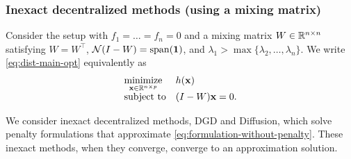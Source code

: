 \documentclass[10pt,mathserif]{beamer}
\begin{document}






\begin{frame}
\frametitle{Inexact decentralized methods (using a mixing matrix)}
Consider the setup with $f_1=\dots=f_n=0$ and a mixing matrix $W\in \mathbb{R}^{n\times n}$ satisfying $W=W^\intercal$, $\mathcal{N}(I-W)=\mathrm{span}({\mathbf{1}})$, and $\lambda_1>\max{\{\lambda_2,\dots,\lambda_n\}}$.
We write \eqref{eq:dist-main-opt} equivalently as
\begin{equation}
\begin{array}{ll}
\underset{{\mathbf{x}}\in\mathbb{R}^{n\times p}}{\mbox{minimize}} &h({\mathbf{x}})\\
\mbox{subject to}&(I-W){\mathbf{x}}=0.
\end{array}
\label{eq:formulation-without-penalty}
\end{equation}

\vspace{0.2in}
We consider inexact decentralized methods, DGD and Diffusion, which solve penalty formulations that approximate \eqref{eq:formulation-without-penalty}.
These inexact methods, when they converge, converge to an approximation solution.
\end{frame}
\end{document}
